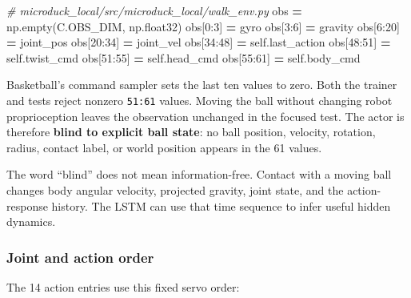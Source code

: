 \documentclass[
  american,
  11pt,
  letterpaper,
]{article}
\newenvironment{Shaded}{\begin{snugshade}}{\end{snugshade}}
\newcommand{\CommentTok}[1]{\textcolor[rgb]{0.56,0.35,0.01}{\textit{#1}}}
\newcommand{\DecValTok}[1]{\textcolor[rgb]{0.00,0.00,0.81}{#1}}
\newcommand{\NormalTok}[1]{#1}
\newcommand{\OperatorTok}[1]{\textcolor[rgb]{0.81,0.36,0.00}{\textbf{#1}}}
\newcommand{\VariableTok}[1]{\textcolor[rgb]{0.00,0.00,0.00}{#1}}
\renewenvironment{Shaded}{\par\smallskip}{\par\smallskip}
\begin{document}
\begin{Shaded}
\begin{Highlighting}[]
\CommentTok{\# microduck\_local/src/microduck\_local/walk\_env.py}
\NormalTok{obs }\OperatorTok{=}\NormalTok{ np.empty(C.OBS\_DIM, np.float32)}
\NormalTok{obs[}\DecValTok{0}\NormalTok{:}\DecValTok{3}\NormalTok{] }\OperatorTok{=}\NormalTok{ gyro}
\NormalTok{obs[}\DecValTok{3}\NormalTok{:}\DecValTok{6}\NormalTok{] }\OperatorTok{=}\NormalTok{ gravity}
\NormalTok{obs[}\DecValTok{6}\NormalTok{:}\DecValTok{20}\NormalTok{] }\OperatorTok{=}\NormalTok{ joint\_pos}
\NormalTok{obs[}\DecValTok{20}\NormalTok{:}\DecValTok{34}\NormalTok{] }\OperatorTok{=}\NormalTok{ joint\_vel}
\NormalTok{obs[}\DecValTok{34}\NormalTok{:}\DecValTok{48}\NormalTok{] }\OperatorTok{=} \VariableTok{self}\NormalTok{.last\_action}
\NormalTok{obs[}\DecValTok{48}\NormalTok{:}\DecValTok{51}\NormalTok{] }\OperatorTok{=} \VariableTok{self}\NormalTok{.twist\_cmd}
\NormalTok{obs[}\DecValTok{51}\NormalTok{:}\DecValTok{55}\NormalTok{] }\OperatorTok{=} \VariableTok{self}\NormalTok{.head\_cmd}
\NormalTok{obs[}\DecValTok{55}\NormalTok{:}\DecValTok{61}\NormalTok{] }\OperatorTok{=} \VariableTok{self}\NormalTok{.body\_cmd}
\end{Highlighting}
\end{Shaded}

Basketball's command sampler sets the last ten values to zero. Both the
trainer and tests reject nonzero \texttt{51:61} values. Moving the ball
without changing robot proprioception leaves the observation unchanged
in the focused test. The actor is therefore \textbf{blind to explicit
ball state}: no ball position, velocity, rotation, radius, contact
label, or world position appears in the 61 values.

The word ``blind'' does not mean information-free. Contact with a moving
ball changes body angular velocity, projected gravity, joint state, and
the action-response history. The LSTM can use that time sequence to
infer useful hidden dynamics.

\subsubsection{Joint and action order}\label{joint-and-action-order}

The 14 action entries use this fixed servo order:
\end{document}
